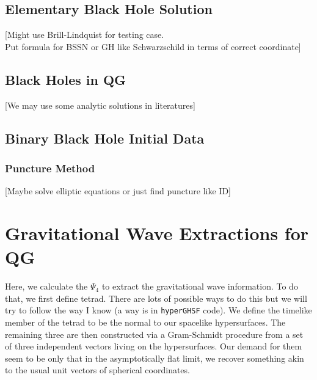 \documentclass[a4paper,oneside,openany,11pt]{memoir}
\numberwithin{equation}{section} %
\newcommand{\NOTE}[1]{{\color{blue}[#1]}}
\begin{document}
\subsection{Elementary Black Hole Solution}

\NOTE{Might use Brill-Lindquist for testing case. \\
Put formula for BSSN or GH like Schwarzschild in terms of correct coordinate}

\subsection{Black Holes in QG}

\NOTE{We may use some analytic solutions in literatures}

\subsection{Binary Black Hole Initial Data}
\subsubsection{Puncture Method}

\NOTE{Maybe solve elliptic equations or just find puncture like ID}

\section{Gravitational Wave Extractions for QG}
Here, we calculate the $\Psi_4$ to extract the gravitational wave information. To do that, we first define tetrad. 
There are lots of possible ways to do this but we will try to follow the way I know 
(a way is in \texttt{hyperGHSF} code). We define the timelike member of the tetrad to be the 
normal to our spacelike hypersurfaces. The remaining three are then constructed 
via a Gram-Schmidt procedure from a set of three independent vectors living on the 
hypersurfaces. Our demand for them seem to be only that in the asymptotically flat limit, 
we recover something akin to the usual unit vectors of spherical coordinates. 
\end{document}
